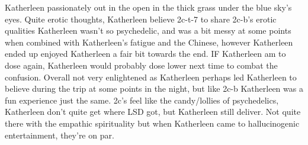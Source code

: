 \documentclass[12pt]{book}
\begin{document}
Katherleen passionately out in the open in the thick grass under the blue sky's eyes. Quite erotic thoughts, Katherleen believe 2c-t-7 to share 2c-b's erotic qualities Katherleen wasn't so psychedelic, and was a bit messy at some points when combined with Katherleen's fatigue and the Chinese, however Katherleen ended up enjoyed Katherleen a fair bit towards the end. IF Katherleen am to dose again, Katherleen would probably dose lower next time to combat the confusion. Overall not very enlightened as Katherleen perhaps led Katherleen to believe during the trip at some points in the night, but like 2c-b Katherleen was a fun experience just the same. 2c's feel like the candy/lollies of psychedelics, Katherleen don't quite get where LSD got, but Katherleen still deliver. Not quite there with the empathic spirituality but when Katherleen came to hallucinogenic entertainment, they're on par.
\end{document}

